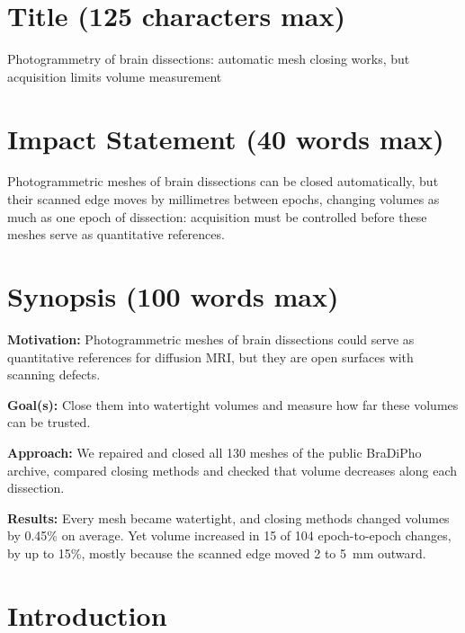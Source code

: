 \documentclass[11pt]{article}
\begin{document}
\section*{Title (125 characters max)}

Photogrammetry of brain dissections: automatic mesh closing works, but
acquisition limits volume measurement

\section*{Impact Statement (40 words max)}

Photogrammetric meshes of brain dissections can be closed automatically, but
their scanned edge moves by millimetres between epochs, changing volumes as
much as one epoch of dissection: acquisition must be controlled before these
meshes serve as quantitative references.

\section*{Synopsis (100 words max)}

\textbf{Motivation:} Photogrammetric meshes of brain dissections could serve
as quantitative references for diffusion MRI, but they are open surfaces with
scanning defects.

\textbf{Goal(s):} Close them into watertight volumes and measure how far
these volumes can be trusted.

\textbf{Approach:} We repaired and closed all 130 meshes of the public
BraDiPho archive, compared closing methods and checked that volume decreases
along each dissection.

\textbf{Results:} Every mesh became watertight, and closing methods changed
volumes by 0.45\% on average. Yet volume increased in 15 of 104
epoch-to-epoch changes, by up to 15\%, mostly because the scanned edge moved
2 to 5~mm outward.

\section*{Introduction}
\end{document}
